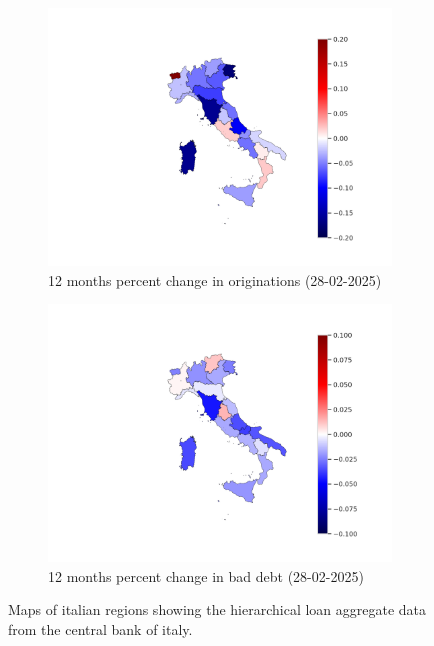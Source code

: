 \documentclass[letterpaper]{article}
\begin{document}
\begin{figure}
    \centering
     \begin{subfigure}[b]{0.47\textwidth}
         \centering
         \includegraphics[width=\textwidth]{bad_loans_map.png}
         \caption{12 months percent change in originations (28-02-2025)}
         \label{fig:sub1}
     \end{subfigure}
     \hfill
     \begin{subfigure}[b]{0.47\textwidth}
         \centering
         \includegraphics[width=\textwidth]{orig_loans_map.png}
         \caption{12 months percent change in bad debt (28-02-2025)}
         \label{fig:sub2}
     \end{subfigure}
     \hfill
        \caption{Maps of italian regions showing the hierarchical loan aggregate data from the central bank of italy.}
        \label{fig:maps}
\end{figure}
\end{document}
